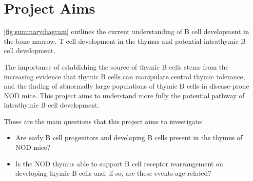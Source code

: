 \section{Project Aims}

\cref{fig:summarydiagram} outlines the current understanding of B cell development in the bone marrow, T cell development in the thymus and potential intrathymic B cell development.

The importance of establishing the source of thymic B cells stems from the increasing evidence that thymic B cells can manipulate central thymic tolerance, and the finding of abnormally large populations of thymic B cells in disease-prone NOD mice.
This project aims to understand more fully the potential pathway of intrathymic B cell development.

These are the main questions that this project aims to investigate:
\begin{itemize}
\item Are early B cell progenitors and developing B cells present in the thymus of NOD mice?
\item Is the NOD thymus able to support B cell receptor rearrangement on developing thymic B cells and, if so, are these events age-related?
\end{itemize}

